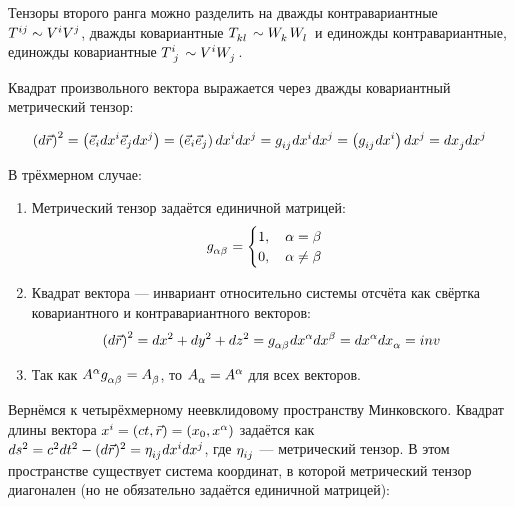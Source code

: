 \documentclass{article}
\begin{document}
Тензоры второго ранга можно разделить на дважды контравариантные $\tensor{T}{^i^j}\sim\tensor{V}{^i}\tensor{V}{^j}$, дважды ковариантные $\tensor{T}{_k_l}\sim\tensor{W}{_k}\tensor{W}{_l}$ и единожды контравариантные, единожды ковариантные $\tensor{T}{^i_j}\sim\tensor{V}{^i}\tensor{W}{_j}$.

Квадрат произвольного вектора выражается через дважды ковариантный метрический тензор:

\begin{equation*}
    \left(d\vec{r}\right)^2=\left(\vec{e}_i d\tensor{x}{^i}\vec{e}_j d\tensor{x}{^j}\right)=\left(\vec{e}_i\vec{e}_j\right)d\tensor{x}{^i}d\tensor{x}{^j}=\tensor{g}{_i_j}d\tensor{x}{^i}d\tensor{x}{^j}=\left(\tensor{g}{_i_j}d\tensor{x}{^i}\right)d\tensor{x}{^j}=d\tensor{x}{_j}d\tensor{x}{^j}
\end{equation*}

В трёхмерном случае:

\begin{enumerate}
    \item
    Метрический тензор задаётся единичной матрицей:
    \begin{equation*}
    \tensor{g}{_\alpha_\beta}=
    \begin{cases}
        1,\quad\alpha=\beta\\
        0,\quad\alpha\ne\beta
    \end{cases}
    \end{equation*}

    \item
    Квадрат вектора --- инвариант относительно системы отсчёта как свёртка ковариантного и контравариантного векторов:
    \begin{equation*}
     \left(d\vec{r}\right)^2=dx^2+dy^2+dz^2=\tensor{g}{_\alpha_\beta}d\tensor{x}{^\alpha}d\tensor{x}{^\beta}=d\tensor{x}{^\alpha}d\tensor{x}{_\alpha}=inv
    \end{equation*}
    
    \item
    Так как $\tensor{A}{^\alpha}\tensor{g}{_\alpha_\beta}=\tensor{A}{_\beta}$, то $\tensor{A}{_\alpha}=\tensor{A}{^\alpha}$ для всех векторов.
\end{enumerate}

Вернёмся к четырёхмерному неевклидовому пространству Минковского. Квадрат длины вектора $\tensor{x}{^i}=(ct,\vec{r})=(x_0,x^\alpha)$ задаётся как $ds^2=c^2dt^2-(d\vec{r})^2=\tensor{\eta}{_i_j}d\tensor{x}{^i}d\tensor{x}{^j}$, где $\tensor{\eta}{_i_j}$ --- метрический тензор.
В этом пространстве существует система координат, в которой метрический тензор диагонален (но не обязательно задаётся единичной матрицей):
\end{document}
